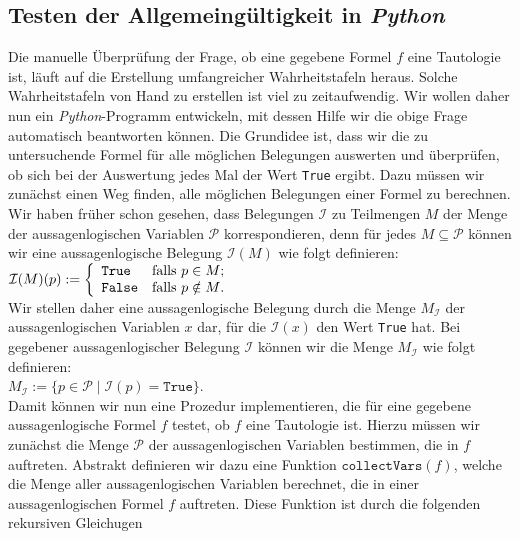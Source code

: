 \subsection{Testen der Allgemeingültigkeit in \textsl{Python}}
\noindent
 Die manuelle Überprüfung der Frage, ob eine gegebene Formel $f$ eine Tautologie ist, 
läuft auf die Erstellung umfangreicher Wahrheitstafeln heraus.   Solche Wahrheitstafeln
von Hand zu erstellen ist viel zu zeitaufwendig. 
Wir wollen daher nun ein \textsl{Python}-Programm entwickeln, mit dessen Hilfe wir die
obige Frage automatisch beantworten können.   Die Grundidee ist, dass wir die zu untersuchende
Formel für alle möglichen Belegungen auswerten und überprüfen, ob sich bei der Auswertung
jedes Mal der Wert \texttt{True} ergibt.  Dazu müssen wir zunächst einen Weg finden, alle
möglichen Belegungen einer Formel zu berechnen.  Wir haben früher schon gesehen, dass
Belegungen $\mathcal{I}$ zu Teilmengen $M$ der Menge der aussagenlogischen Variablen
$\mathcal{P}$ korrespondieren, denn für jedes $M \subseteq \mathcal{P}$ können wir eine
aussagenlogische Belegung $\mathcal{I}(M)$ wie folgt definieren:
\\[0.2cm]
\hspace*{1.3cm}
$\mathcal{I}(M)(p) := \left\{
\begin{array}[c]{ll}
  \texttt{True}  & \mbox{falls $p \in M$;} \\
  \texttt{False} & \mbox{falls $p \notin M$.}
\end{array}
\right.
$
\\[0.2cm]
Wir stellen daher eine aussagenlogische Belegung durch die Menge $M_\mathcal{I}$ der aussagenlogischen Variablen
$x$ dar, für die $\mathcal{I}(x)$ den Wert \texttt{True} hat.  Bei gegebener aussagenlogischer Belegung
$\mathcal{I}$ können wir die Menge $M_\mathcal{I}$ wie folgt definieren:
\\[0.2cm]
\hspace*{1.3cm}
$M_\mathcal{I} := \bigl\{ p \in \mathcal{P} \mid \mathcal{I}(p) = \mathtt{True} \bigr\}$.
\\[0.2cm]
Damit können wir nun eine Prozedur implementieren, die für eine gegebene aussagenlogische Formel $f$
testet, ob $f$ eine Tautologie ist.  Hierzu müssen wir zunächst die Menge $\mathcal{P}$ der
aussagenlogischen Variablen bestimmen, die in $f$ auftreten.  Abstrakt definieren wir dazu eine Funktion 
$\mathtt{collectVars}(f)$, welche die Menge aller aussagenlogischen Variablen berechnet, die in einer
aussagenlogischen Formel $f$ auftreten.  Diese Funktion ist durch die folgenden rekursiven Gleichugen 
